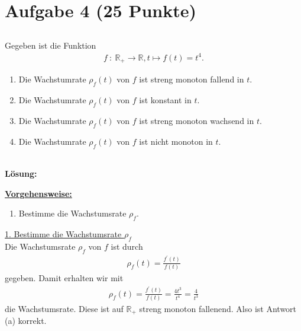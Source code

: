 \newpage
\section*{Aufgabe 4 (25 Punkte)}
\vspace{0.4cm}
\subsection*{}
Gegeben ist die Funktion 
\begin{align*}
f \ : \ \mathbb{R}_+ \to \mathbb{R},
t \mapsto f(t) = t^4.
\end{align*}
\renewcommand{\labelenumi}{(\alph{enumi})}
\begin{enumerate}
\item Die Wachstumrate $\rho_f(t)$ von $f$ ist streng monoton fallend in $t$.
\item Die Wachstumrate $\rho_f(t)$ von $f$ ist konstant in $t$.
\item Die Wachstumrate $\rho_f(t)$ von $f$ ist streng monoton wachsend in $t$.
\item Die Wachstumrate $\rho_f(t)$ von $f$ ist nicht monoton in $t$.
\end{enumerate}
\ \\
\textbf{Lösung:}
\begin{mdframed}
\underline{\textbf{Vorgehensweise:}}
\renewcommand{\labelenumi}{\theenumi.}
\begin{enumerate}
\item Bestimme die Wachstumsrate $\rho_f$.
\end{enumerate}
\end{mdframed}

\underline{1. Bestimme die Wachstumsrate $\rho_f$}\\
Die Wachstumsrate $\rho_f$ von $f$ ist durch
\begin{align*}
\rho_f(t) = \frac{f^\prime(t)}{f(t)}
\end{align*} 
gegeben.
Damit erhalten wir mit
\begin{align*}
\rho_f(t) = \frac{f^\prime(t)}{f(t)}
= \frac{4  t^3}{t^4}
= \frac{4}{t^3}
\end{align*} 
die Wachstumsrate.
Diese ist auf $\mathbb{R}_+$ streng monoton fallenend.
Also ist Antwort (a) korrekt.

\newpage


